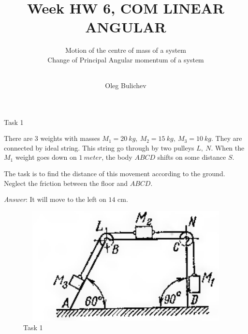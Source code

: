 \documentclass[aspectratio=169]{beamer}
\title[Theoretical Mechanics]{Week HW 6, COM LINEAR ANGULAR} %
\subtitle{Motion of the centre of mass of a system\\
Change of Principal Angular momentum of a system\\
\ 
         } %
\author{Oleg Bulichev}
\newcommand{\fbckg}[1]{\usebackgroundtemplate{\texttt{[image: \#1]}}}%
\begin{document}
\setlength{\abovedisplayskip}{0pt}
\setlength{\belowdisplayskip}{0pt}
\setlength{\abovedisplayshortskip}{0pt}
\setlength{\belowdisplayshortskip}{0pt}

\fbckg{fibeamer/figs/title_page.png}

\fbckg{fibeamer/figs/common.png}


\begin{frame}[t]{Task 1}
  \begin{minipage}{0.6\textwidth}
    There are 3 weights with masses $M_1=20\ kg,\ M_2=15\ kg,\ M_3=10\ kg$. They are connected by ideal string. This string go through by two pulleys $L,\ N$. When the $M_1$ weight goes down on $1\ meter$, the body $ABCD$ shifts on some distance $S$.

    The task is to find the distance of this movement according to the ground. Neglect the friction between the floor and $ABCD$. \smallskip
    
    \textit{Answer}: It will move to the left on $14$ cm.
  \end{minipage}
  \begin{minipage}{0.39\textwidth}
    \begin{figure}[H]
      \centering\includegraphics[height=6cm,width=1\textwidth,keepaspectratio]{HW5_3}
      \caption*{Task 1}
    \end{figure}
  \end{minipage}
\end{frame}
\end{document}
